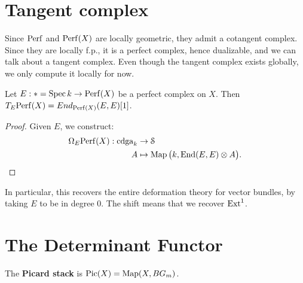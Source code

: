 \section{Tangent complex}
Since $\mathrm{Perf}$ and $\mathrm{Perf}(X)$ are locally geometric, they admit a cotangent complex. Since they are locally f.p., it is a perfect
complex, hence dualizable, and we can talk about a tangent complex. Even though the tangent complex exists globally, we only
compute it locally for now.


\begin{thm}
\label{thm:tangent_perf}
Let $E : * = \operatorname{Spec} k \to \mathrm{Perf}(X)$ be a perfect complex on $X$. Then $T_E \mathrm{Perf}(X) = End_{\mathrm{Perf}(X)}(E,E) [1]$. 
\end{thm}
\begin{proof}
Given $E$, we construct:
\begin{align*}
\Omega_E \mathrm{Perf}(X) : \operatorname{cdga}_k &\to \mathcal S \\
A &\mapsto \operatorname{Map}\big(k, \operatorname{End}(E,E) \otimes A\big) .
\end{align*}
\end{proof}


\begin{rem}
In particular, this recovers the entire deformation theory for vector bundles, by taking $E$ to be in degree 0. The shift means
that we recover $\operatorname{Ext}^1$. 
\end{rem}


\section{The Determinant Functor}
\begin{defin}
The \textbf{Picard stack} is $\operatorname{Pic}(X) = \operatorname{Map}(X, B G_m)$.
\end{defin}

